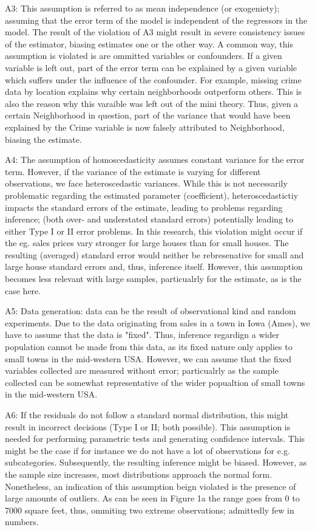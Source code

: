 \documentclass[a4paper]{article}
\begin{document}
A3: This assumption is referred to as mean independence (or exogeniety); assuming that the error term of the model is independent of the regressors in the model. The result of the violation of A3 might result in severe consistency issues of the estimator, biasing estimates one or the other way.
A common way, this assumption is violated is are ommitted variables or confounders. If a given variable is left out, part of the error term can be explained by a given variable which suffers under the influence of the confounder. For example, missing crime data by location explains why certain neighborhoods outperform others. This is also the reason why this varaible was left out of the mini theory. Thus, given a certain Neighborhood in question, part of the variance that would have been explained by the Crime variable is now falsely attributed to Neighborhood, biasing the estimate.

A4: The assumption of homoscedasticity assumes constant variance for the error term. However, if the variance of the estimate is varying for different observations, we face heteroscedastic variances. While this is not necessarily problematic regarding the estimated parameter (coefficient), heteroscedastictiy impacts the standard errors of the estimate, leading to problems regarding inference; (both over- and understated standard errors) potentially leading to either Type I or II error problems. In this research, this violation might occur if the eg. sales prices vary stronger for large houses than for small houses. The resulting (averaged) standard error would neither be rebresenative for small and large house standard errors and, thus, inference itself. However, this assumption becomes less relevant with large samples, particualrly for the estimate, as is the case here.

A5: Data generation: data can be the result of observational kind and random experiments. Due to the data originating from sales in a town in Iowa (Ames), we have to assume that the data is "fixed". Thus, inference regardign a wider population cannot be made from this data, as its fixed nature only applies to small towns in the mid-western USA. However, we can assume that the fixed variables collected are measured without error; particualrly as the sample collected can be somewhat representative of the wider popualtion of small towns in the mid-western USA. 

A6: If the residuals do not follow a standard normal distribution, this might result in incorrect decisions (Type I or II; both possible). This assumption is needed for performing parametric tests and generating confidence intervals. This might be the case if for instance we do not have a lot of observations for e.g. subcategories. Subsequently, the resulting inference might be biased. However, as the sample size increases, most distributions approach the normal form. 
 Nonetheless, an indication of this assumption beign violated is the presence of large amounts of outliers. As can be seen in Figure 1a the range goes from 0 to 7000 square feet, thus, ommiting two extreme observations; admittedly few in numbers. 
\end{document}
